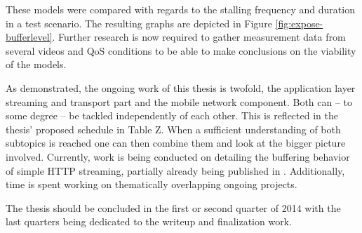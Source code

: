 These models were compared with regards to the stalling frequency and duration in a test scenario. The resulting graphs are depicted in Figure \ref{fig:expose-bufferlevel}. Further research is now required to gather measurement data from several videos and QoS conditions to be able to make conclusions on the viability of the models.




As demonstrated, the ongoing work of this thesis is twofold, the application layer streaming and transport part and the mobile network component. Both can -- to some degree -- be tackled independently of each other. This is reflected in the thesis' proposed schedule in Table Z. When a sufficient understanding of both subtopics is reached one can then combine them and look at the bigger picture involved. Currently, work is being conducted on detailing the buffering behavior of simple HTTP streaming, partially already being published in \cite{metzger2011delivery}. Additionally, time is spent working on thematically overlapping ongoing projects.

The thesis should be concluded in the first or second quarter of 2014 with the last quarters being dedicated to the writeup and finalization work.
















